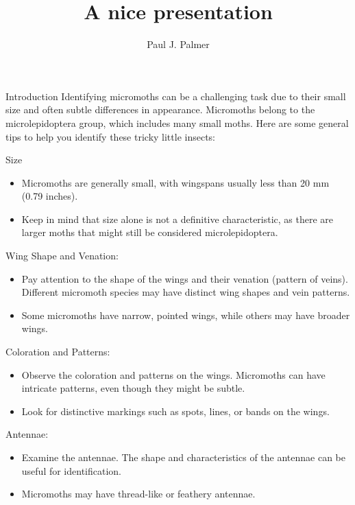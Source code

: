 \documentclass[
  ignorenonframetext,
]{beamer}
\title{A nice presentation}
\author{Paul J. Palmer}
\date{}
\providecommand{\tightlist}{%
  \setlength{\itemsep}{0pt}\setlength{\parskip}{0pt}}
\begin{document}
\frame{\titlepage}

\begin{frame}{Introduction}
\protect\hypertarget{introduction}{}
Identifying micromoths can be a challenging task due to their small size
and often subtle differences in appearance. Micromoths belong to the
microlepidoptera group, which includes many small moths. Here are some
general tips to help you identify these tricky little insects:
\end{frame}

\begin{frame}{Size}
\protect\hypertarget{size}{}
\begin{itemize}
\tightlist
\item
  Micromoths are generally small, with wingspans usually less than 20 mm
  (0.79 inches).
\item
  Keep in mind that size alone is not a definitive characteristic, as
  there are larger moths that might still be considered
  microlepidoptera.
\end{itemize}
\end{frame}

\begin{frame}{Wing Shape and Venation:}
\protect\hypertarget{wing-shape-and-venation}{}
\begin{itemize}
\tightlist
\item
  Pay attention to the shape of the wings and their venation (pattern of
  veins). Different micromoth species may have distinct wing shapes and
  vein patterns.
\item
  Some micromoths have narrow, pointed wings, while others may have
  broader wings.
\end{itemize}
\end{frame}

\begin{frame}{Coloration and Patterns:}
\protect\hypertarget{coloration-and-patterns}{}
\begin{itemize}
\tightlist
\item
  Observe the coloration and patterns on the wings. Micromoths can have
  intricate patterns, even though they might be subtle.
\item
  Look for distinctive markings such as spots, lines, or bands on the
  wings.
\end{itemize}
\end{frame}

\begin{frame}{Antennae:}
\protect\hypertarget{antennae}{}
\begin{itemize}
\tightlist
\item
  Examine the antennae. The shape and characteristics of the antennae
  can be useful for identification.
\item
  Micromoths may have thread-like or feathery antennae.
\end{itemize}
\end{frame}
\end{document}
